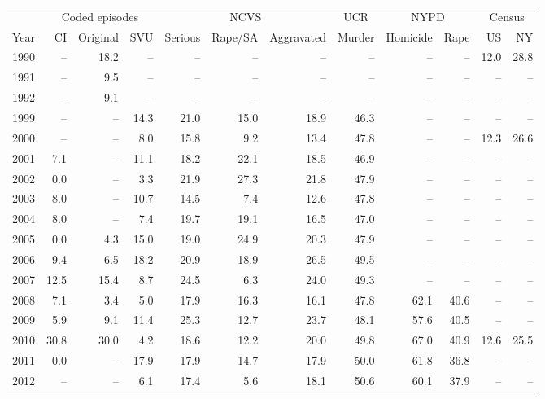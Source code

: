 \begin{center}
\label{tab:v_race}
\small
\setlength{\tabcolsep}{2.5pt}
\renewcommand{\arraystretch}{1.08}
\begin{tabular}{@{}rrrrrrrrrrrr@{}}
\toprule
 & \multicolumn{3}{c}{Coded episodes} & \multicolumn{3}{c}{NCVS} & \multicolumn{1}{c}{UCR} & \multicolumn{2}{c}{NYPD} & \multicolumn{2}{c}{Census} \\
\cmidrule(lr){2-4}
\cmidrule(lr){5-7}
\cmidrule(lr){8-8}
\cmidrule(lr){9-10}
\cmidrule(lr){11-12}
Year & CI & Original & SVU & Serious & Rape/SA & Aggravated & Murder & Homicide & Rape & US & NY \\
\midrule
1990 & -- & 18.2 & -- & -- & -- & -- & -- & -- & -- & 12.0 & 28.8 \\
1991 & -- & 9.5 & -- & -- & -- & -- & -- & -- & -- & -- & -- \\
1992 & -- & 9.1 & -- & -- & -- & -- & -- & -- & -- & -- & -- \\
1999 & -- & -- & 14.3 & 21.0 & 15.0 & 18.9 & 46.3 & -- & -- & -- & -- \\
2000 & -- & -- & 8.0 & 15.8 & 9.2 & 13.4 & 47.8 & -- & -- & 12.3 & 26.6 \\
2001 & 7.1 & -- & 11.1 & 18.2 & 22.1 & 18.5 & 46.9 & -- & -- & -- & -- \\
2002 & 0.0 & -- & 3.3 & 21.9 & 27.3 & 21.8 & 47.9 & -- & -- & -- & -- \\
2003 & 8.0 & -- & 10.7 & 14.5 & 7.4 & 12.6 & 47.8 & -- & -- & -- & -- \\
2004 & 8.0 & -- & 7.4 & 19.7 & 19.1 & 16.5 & 47.0 & -- & -- & -- & -- \\
2005 & 0.0 & 4.3 & 15.0 & 19.0 & 24.9 & 20.3 & 47.9 & -- & -- & -- & -- \\
2006 & 9.4 & 6.5 & 18.2 & 20.9 & 18.9 & 26.5 & 49.5 & -- & -- & -- & -- \\
2007 & 12.5 & 15.4 & 8.7 & 24.5 & 6.3 & 24.0 & 49.3 & -- & -- & -- & -- \\
2008 & 7.1 & 3.4 & 5.0 & 17.9 & 16.3 & 16.1 & 47.8 & 62.1 & 40.6 & -- & -- \\
2009 & 5.9 & 9.1 & 11.4 & 25.3 & 12.7 & 23.7 & 48.1 & 57.6 & 40.5 & -- & -- \\
2010 & 30.8 & 30.0 & 4.2 & 18.6 & 12.2 & 20.0 & 49.8 & 67.0 & 40.9 & 12.6 & 25.5 \\
2011 & 0.0 & -- & 17.9 & 17.9 & 14.7 & 17.9 & 50.0 & 61.8 & 36.8 & -- & -- \\
2012 & -- & -- & 6.1 & 17.4 & 5.6 & 18.1 & 50.6 & 60.1 & 37.9 & -- & -- \\

\end{tabular}
\end{center}
